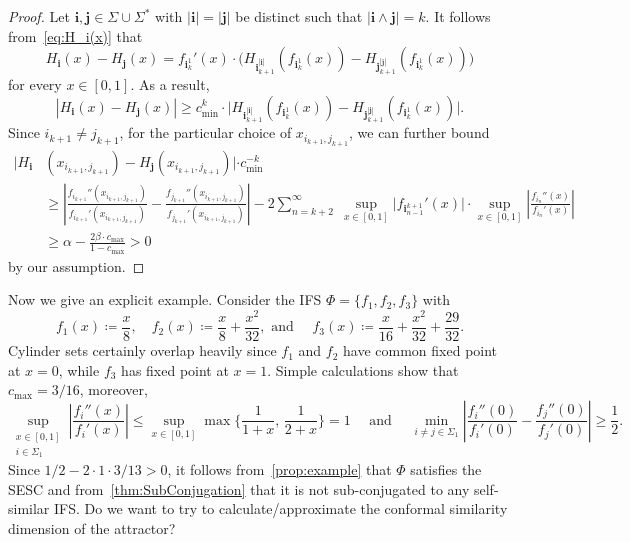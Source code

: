 \documentclass[12pt,]{article}
\theoremstyle{definition}
\theoremstyle{remark}
\newcommand{\0}{\mathbf{0}}
\newcommand{\bi}{\mathbf{i}}
\newcommand{\bj}{\mathbf{j}}
\begin{document}
{\begin{proof}
Let $\bi,\bj \in\Sigma\cup\Sigma^*$ with $|\bi|=|\bj|$ be distinct such that $|\bi\wedge \bj|=k$. It follows from~\cref{eq:H_i(x)} that
\begin{equation*}
H_{\bi}(x)-H_{\bj}(x) = f_{\bi_k^1}'(x)\cdot \big( H_{\bi_{k+1}^{|\bi|}}(f_{\bi_k^1}(x)) - H_{\bj_{k+1}^{|\bj|}}(f_{\bi_k^1}(x)) \big)
\end{equation*}
for every $x\in[0,1]$. As a result,
\begin{equation*}
|H_{\bi}(x)-H_{\bj}(x)| \geq c_{\min}^k\cdot \big| H_{\bi_{k+1}^{|\bi|}}(f_{\bi_k^1}(x)) - H_{\bj_{k+1}^{|\bj|}}(f_{\bi_k^1}(x)) \big|.
\end{equation*}
Since $i_{k+1}\neq j_{k+1}$, for the particular choice of $x_{i_{k+1},j_{k+1}}$, we can further bound 
\begin{align*}
|H_{\bi}&(x_{i_{k+1},j_{k+1}}) - H_{\bj}(x_{i_{k+1},j_{k+1}})|\cdot c_{\min}^{-k} \\
&\geq \left| \frac{f_{i_{k+1}}''(x_{i_{k+1},j_{k+1}})}{f_{i_{k+1}}'(x_{i_{k+1},j_{k+1}})} - \frac{f_{j_{k+1}}''(x_{i_{k+1},j_{k+1}})}{f_{j_{k+1}}'(x_{i_{k+1},j_{k+1}})} \right| - 2 \sum_{n=k+2}^{\infty}\; \sup_{x\in[0,1]} \big| f_{\bi_{n-1}^{k+1}}'(x) \big| \cdot \sup_{x\in[0,1]} \left| \frac{f_{i_n}''(x)}{f_{i_n}'(x)} \right| \\
&\geq \alpha -  \frac{2\beta\cdot c_{\max}}{1-c_{\max}} >0
\end{align*}
by our assumption.
\end{proof}

Now we give an explicit example. Consider the IFS $\Phi=\{f_1,f_2,f_3\}$ with
\begin{equation*}
f_1(x)\coloneqq \frac{x}{8}, \quad f_2(x)\coloneqq \frac{x}{8} + \frac{x^2}{32}, \text{ and } \quad f_3(x)\coloneqq \frac{x}{16} + \frac{x^2}{32} + \frac{29}{32}. 
\end{equation*}
Cylinder sets certainly overlap heavily since $f_1$ and $f_2$ have common fixed point at $x=0$, while $f_3$ has fixed point at $x=1$. Simple calculations show that $c_{\max}=3/16$, moreover,
\begin{equation*}
\sup_{\substack{x\in[0,1] \\ i\in\Sigma_1}} \left| \frac{f_i''(x)}{f_i'(x)} \right| \leq  \sup_{x\in[0,1]} \max\Big\{\frac{1}{1+x},\, \frac{1}{2+x} \Big\} = 1 \quad\text{ and }\quad \min_{i\neq j\in\Sigma_1}\left| \frac{f_i''(0)}{f_i'(0)} - \frac{f_j''(0)}{f_j'(0)} \right| \geq \frac{1}{2} .
\end{equation*}
Since $1/2-2\cdot 1\cdot 3/13>0$, it follows from~\cref{prop:example} that $\Phi$ satisfies the SESC and from~\cref{thm:SubConjugation} that it is not sub-conjugated to any self-similar IFS. {\color{red} Do we want to try to calculate/approximate the conformal similarity dimension of the attractor?}

}
\end{document}
